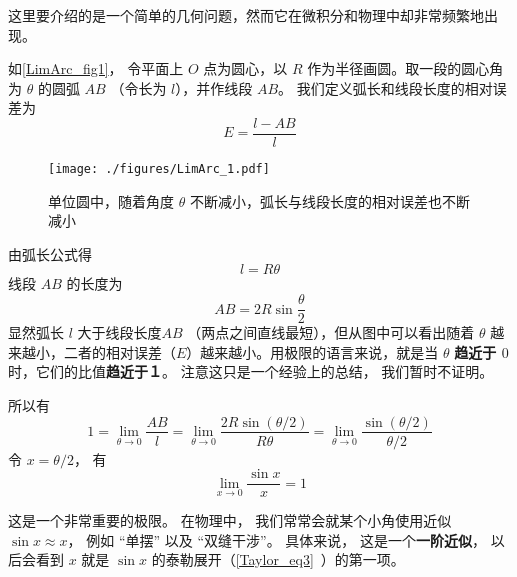 

这里要介绍的是一个简单的几何问题，然而它在微积分和物理中却非常频繁地出现。

如\autoref{LimArc_fig1}， 令平面上 $O$ 点为圆心，以 $R$ 作为半径画圆。取一段的圆心角为 $\theta $ 的圆弧 $AB$ （令长为 $l$），并作线段 $AB$。 我们定义弧长和线段长度的相对误差为
\begin{equation}
E = \frac{l - AB}{l}
\end{equation}

\begin{figure}[ht]
\centering
\texttt{[image: ./figures/LimArc\_1.pdf]}
\caption{单位圆中，随着角度 $\theta$ 不断减小，弧长与线段长度的相对误差也不断减小}\label{LimArc_fig1}
\end{figure}

由弧长公式得
\begin{equation} \label{LimArc_eq1}
l = R\theta 
\end{equation}
线段 $AB$ 的长度为
\begin{equation}\label{LimArc_eq2}
AB = 2R\sin \frac{\theta }{2}
\end{equation}
显然弧长 $l$ 大于线段长度$AB$ （两点之间直线最短），但从图中可以看出随着 $\theta $ 越来越小，二者的相对误差（$E$）越来越小。用极限的语言来说，就是当 $\theta $ \textbf{趋近于 $0$ } 时，它们的比值\textbf{趋近于１}。 注意这只是一个经验上的总结， 我们暂时不证明。

所以有
\begin{equation}
1=\lim_{\theta\to 0} \frac{AB}{l} = \lim_{\theta\to 0} \frac{2R\sin (\theta/2)}{R\theta} 
= \lim_{\theta\to 0}\frac{\sin (\theta/2)}{\theta/2}
\end{equation}
令 $x = \theta/2$， 有
\begin{equation}
\lim_{x\to 0} \frac{\sin x}{x} = 1
\end{equation}

这是一个非常重要的极限。 在物理中， 我们常常会就某个小角使用近似 $\sin x \approx x$， 例如 “单摆” 以及 “双缝干涉”。 具体来说， 这是一个\textbf{一阶近似}，  以后会看到 $x$ 就是 $\sin x$ 的泰勒展开（\autoref{Taylor_eq3}~）的第一项。

